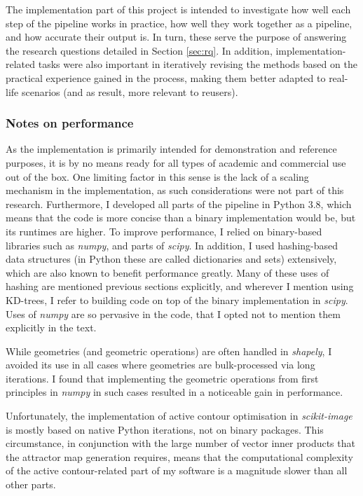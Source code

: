 The implementation part of this project is intended to investigate how well each step of the pipeline works in practice, how well they work together as a pipeline, and how accurate their output is. In turn, these serve the purpose of answering the research questions detailed in Section \ref{sec:rq}. In addition, implementation-related tasks were also important in iteratively revising the methods based on the practical experience gained in the process, making them better adapted to real-life scenarios (and as result, more relevant to reusers).

\subsubsection{Notes on performance}

As the implementation is primarily intended for demonstration and reference purposes, it is by no means ready for all types of academic and commercial use out of the box. One limiting factor in this sense is the lack of a scaling mechanism in the implementation, as such considerations were not part of this research. Furthermore, I developed all parts of the pipeline in Python 3.8, which means that the code is more concise than a binary implementation would be, but its runtimes are higher. To improve performance, I relied on binary-based libraries such as \textit{numpy}, and parts of \textit{scipy}. In addition, I used hashing-based data structures (in Python these are called dictionaries and sets) extensively, which are also known to benefit performance greatly. Many of these uses of hashing are mentioned previous sections explicitly, and wherever I mention using KD-trees, I refer to building code on top of the binary implementation in \textit{scipy}. Uses of \textit{numpy} are so pervasive in the code, that I opted not to mention them explicitly in the text.

While geometries (and geometric operations) are often handled in \textit{shapely}, I avoided its use in all cases where geometries are bulk-processed via long iterations. I found that implementing the geometric operations from first principles in \textit{numpy} in such cases resulted in a noticeable gain in performance.

Unfortunately, the implementation of active contour optimisation in \textit{scikit-image} is mostly based on native Python iterations, not on binary packages. This circumstance, in conjunction with the large number of vector inner products that the attractor map generation requires, means that the computational complexity of the active contour-related part of my software is a magnitude slower than all other parts.

